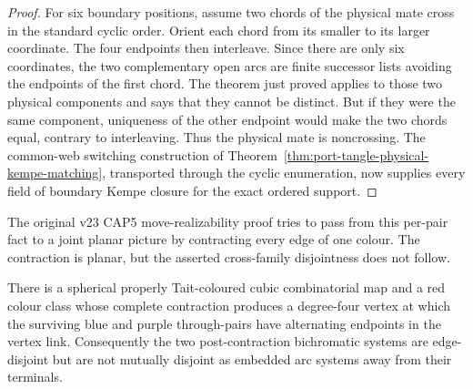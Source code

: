 \begin{proof}
For six boundary positions, assume two chords of the physical mate cross in
the standard cyclic order.  Orient each chord from its smaller to its larger
coordinate.  The four endpoints then interleave.  Since there are only six
coordinates, the two complementary open arcs are finite successor lists
avoiding the endpoints of the first chord.  The theorem just proved applies
to those two physical components and says that they cannot be distinct.  But
if they were the same component, uniqueness of the other endpoint would make
the two chords equal, contrary to interleaving.  Thus the physical mate is
noncrossing.  The common-web switching construction of
Theorem~\ref{thm:port-tangle-physical-kempe-matching}, transported through the
cyclic enumeration, now supplies every field of boundary Kempe closure for
the exact ordered support.
\end{proof}

The original v23 CAP5 move-realizability proof tries to pass from this
per-pair fact to a joint planar picture by contracting every edge of one
colour.  The contraction is planar, but the asserted cross-family
disjointness does not follow.

\begin{proposition}
\label{prop:v23-zero-contraction-crossing}
There is a spherical properly Tait-coloured cubic combinatorial map and a red
colour class whose complete contraction produces a degree-four vertex at
which the surviving blue and purple through-pairs have alternating endpoints
in the vertex link.
Consequently the two post-contraction bichromatic systems are edge-disjoint
but are not mutually disjoint as embedded arc systems away from their
terminals.
\end{proposition}

